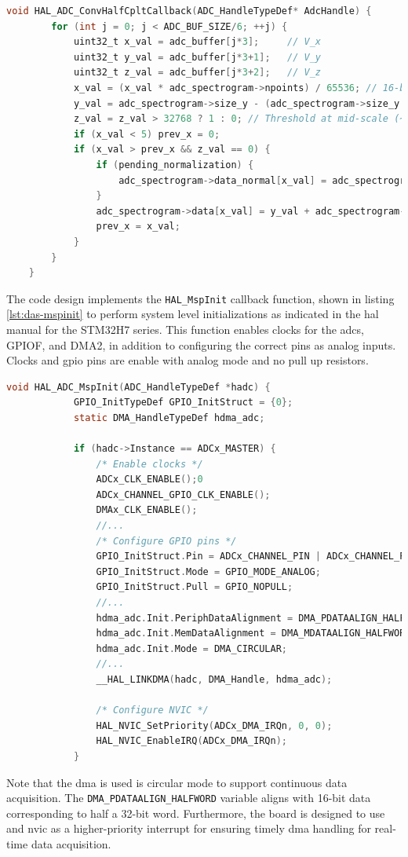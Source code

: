 \documentclass[class=report,11pt,crop=false]{standalone}
\begin{document}
	\begin{lstlisting}[language=C, label={lst:das-callbacks}, caption={Showing conversion callbacks for processing \acrshort{adc} data when the \acrshort{dma} fills half.}]
	void HAL_ADC_ConvHalfCpltCallback(ADC_HandleTypeDef* AdcHandle) {
		for (int j = 0; j < ADC_BUF_SIZE/6; ++j) {
			uint32_t x_val = adc_buffer[j*3];     // V_x
			uint32_t y_val = adc_buffer[j*3+1];   // V_y
			uint32_t z_val = adc_buffer[j*3+2];   // V_z
			x_val = (x_val * adc_spectrogram->npoints) / 65536; // 16-bit scaling
			y_val = adc_spectrogram->size_y - (adc_spectrogram->size_y * y_val) / 65536;
			z_val = z_val > 32768 ? 1 : 0; // Threshold at mid-scale (~1.65 V)
			if (x_val < 5) prev_x = 0;
			if (x_val > prev_x && z_val == 0) {
				if (pending_normalization) {
					adc_spectrogram->data_normal[x_val] = adc_spectrogram->size_y/2 - y_val;
				}
				adc_spectrogram->data[x_val] = y_val + adc_spectrogram->data_normal[x_val];
				prev_x = x_val;
			}
		}
	}
	\end{lstlisting}
	The code design implements the \texttt{HAL\_MspInit} callback function, shown in listing \ref{lst:das-mspinit} to perform system level initializations as indicated in the \acrshort{hal} manual for the STM32H7 series. This function enables clocks for the \acrshort{adc}s, GPIOF, and DMA2, in addition to configuring the correct pins as analog inputs. Clocks and \acrshort{gpio} pins are enable with analog mode and no pull up resistors. 
	\begin{lstlisting}[language=C, label={lst:das-callbacks}, caption={Showing conversion callbacks for processing \acrshort{adc} data when the \acrshort{dma} fills half.}]
		void HAL_ADC_MspInit(ADC_HandleTypeDef *hadc) {
			GPIO_InitTypeDef GPIO_InitStruct = {0};
			static DMA_HandleTypeDef hdma_adc;
			
			if (hadc->Instance == ADCx_MASTER) {
				/* Enable clocks */
				ADCx_CLK_ENABLE();0
				ADCx_CHANNEL_GPIO_CLK_ENABLE();
				DMAx_CLK_ENABLE();
				//...
				/* Configure GPIO pins */
				GPIO_InitStruct.Pin = ADCx_CHANNEL_PIN | ADCx_CHANNEL_PIN2 | ADCx_CHANNEL_PIN3;
				GPIO_InitStruct.Mode = GPIO_MODE_ANALOG;
				GPIO_InitStruct.Pull = GPIO_NOPULL;
				//...
				hdma_adc.Init.PeriphDataAlignment = DMA_PDATAALIGN_HALFWORD; // 16-bit
				hdma_adc.Init.MemDataAlignment = DMA_MDATAALIGN_HALFWORD;
				hdma_adc.Init.Mode = DMA_CIRCULAR;
				//...
				__HAL_LINKDMA(hadc, DMA_Handle, hdma_adc);
				
				/* Configure NVIC */
				HAL_NVIC_SetPriority(ADCx_DMA_IRQn, 0, 0);
				HAL_NVIC_EnableIRQ(ADCx_DMA_IRQn);
			}
	\end{lstlisting}
	Note that the \acrshort{dma} is used is circular mode to support continuous data acquisition. The \texttt{DMA\_PDATAALIGN\_HALFWORD} variable aligns with 16-bit data corresponding to half a 32-bit word. Furthermore, the board is designed to use and \acrfull{nvic} as a higher-priority interrupt for ensuring timely \acrshort{dma} handling for real-time data acquisition. 
	
\end{document}
